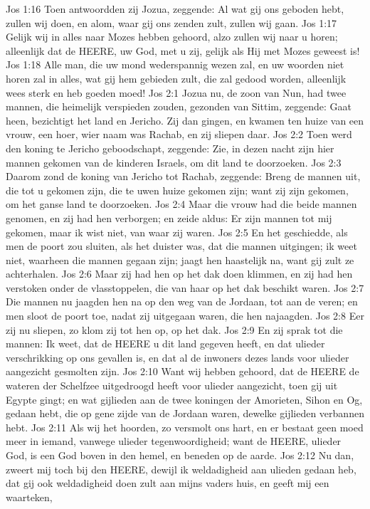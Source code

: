 Jos 1:16  Toen antwoordden zij Jozua, zeggende: Al wat gij ons geboden hebt, zullen wij doen, en alom, waar gij ons zenden zult, zullen wij gaan.
Jos 1:17  Gelijk wij in alles naar Mozes hebben gehoord, alzo zullen wij naar u horen; alleenlijk dat de HEERE, uw God, met u zij, gelijk als Hij met Mozes geweest is!
Jos 1:18  Alle man, die uw mond wederspannig wezen zal, en uw woorden niet horen zal in alles, wat gij hem gebieden zult, die zal gedood worden, alleenlijk wees sterk en heb goeden moed!
Jos 2:1  Jozua nu, de zoon van Nun, had twee mannen, die heimelijk verspieden zouden, gezonden van Sittim, zeggende: Gaat heen, bezichtigt het land en Jericho. Zij dan gingen, en kwamen ten huize van een vrouw, een hoer, wier naam was Rachab, en zij sliepen daar.
Jos 2:2  Toen werd den koning te Jericho geboodschapt, zeggende: Zie, in dezen nacht zijn hier mannen gekomen van de kinderen Israels, om dit land te doorzoeken.
Jos 2:3  Daarom zond de koning van Jericho tot Rachab, zeggende: Breng de mannen uit, die tot u gekomen zijn, die te uwen huize gekomen zijn; want zij zijn gekomen, om het ganse land te doorzoeken.
Jos 2:4  Maar die vrouw had die beide mannen genomen, en zij had hen verborgen; en zeide aldus: Er zijn mannen tot mij gekomen, maar ik wist niet, van waar zij waren.
Jos 2:5  En het geschiedde, als men de poort zou sluiten, als het duister was, dat die mannen uitgingen; ik weet niet, waarheen die mannen gegaan zijn; jaagt hen haastelijk na, want gij zult ze achterhalen.
Jos 2:6  Maar zij had hen op het dak doen klimmen, en zij had hen verstoken onder de vlasstoppelen, die van haar op het dak beschikt waren.
Jos 2:7  Die mannen nu jaagden hen na op den weg van de Jordaan, tot aan de veren; en men sloot de poort toe, nadat zij uitgegaan waren, die hen najaagden.
Jos 2:8  Eer zij nu sliepen, zo klom zij tot hen op, op het dak.
Jos 2:9  En zij sprak tot die mannen: Ik weet, dat de HEERE u dit land gegeven heeft, en dat ulieder verschrikking op ons gevallen is, en dat al de inwoners dezes lands voor ulieder aangezicht gesmolten zijn.
Jos 2:10  Want wij hebben gehoord, dat de HEERE de wateren der Schelfzee uitgedroogd heeft voor ulieder aangezicht, toen gij uit Egypte gingt; en wat gijlieden aan de twee koningen der Amorieten, Sihon en Og, gedaan hebt, die op gene zijde van de Jordaan waren, dewelke gijlieden verbannen hebt.
Jos 2:11  Als wij het hoorden, zo versmolt ons hart, en er bestaat geen moed meer in iemand, vanwege ulieder tegenwoordigheid; want de HEERE, ulieder God, is een God boven in den hemel, en beneden op de aarde.
Jos 2:12  Nu dan, zweert mij toch bij den HEERE, dewijl ik weldadigheid aan ulieden gedaan heb, dat gij ook weldadigheid doen zult aan mijns vaders huis, en geeft mij een waarteken,

